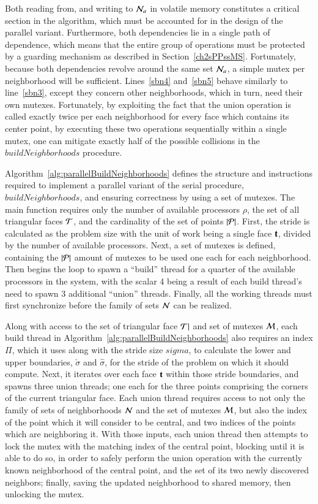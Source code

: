 Both reading from, and writing to $\mathcal{N}_a$ in volatile memory constitutes a critical section in the algorithm, which must be accounted for in the design of the parallel variant. Furthermore, both dependencies lie in a single path of dependence, which means that the entire group of operations must be protected by a guarding mechanism as described in Section~\ref{ch2sPPssMS}. Fortunately, because both dependencies revolve around the same set $\mathcal{N}_a$, a simple mutex per neighborhood will be sufficient. Lines~\ref{sbn4} and~\ref{sbn5} behave similarly to line~\ref{sbn3}, except they concern other neighborhoods, which in turn, need their own mutexes. Fortunately, by exploiting the fact that the union operation is called exactly twice per each neighborhood for every face which contains its center point, by executing these two operations sequentially within a single mutex, one can mitigate exactly half of the possible collisions in the $\mathit{buildNeighborhoods}$ procedure.

Algorithm~\ref{alg:parallelBuildNeighborhoods} defines the structure and instructions required to implement a parallel variant of the serial procedure, $\mathit{buildNeighborhoods}$, and ensuring correctness by using a set of mutexes. The main function requires only the number of available processors $\rho$, the set of all triangular faces $\mathcal{T}$, and the cardinality of the set of points $|\mathcal{P}|$. First, the stride is calculated as the problem size with the unit of work being a single face $\mathbf{t}$, divided by the number of available processors. Next, a set of mutexes is defined, containing the $|\mathcal{P}|$ amount of mutexes to be used one each for each neighborhood.  Then begins the loop to spawn a ``build'' thread for a quarter of the available processors in the system, with the scalar 4 being a result of each build thread's need to spawn 3 additional ``union'' threads. Finally, all the working threads must first synchronize before the family of sets $\mathcal{N}$ can be realized.

Along with access to the set of triangular face $\mathcal{T}|$ and set of mutexes $\mathcal{M}$, each build thread in Algorithm~\ref{alg:parallelBuildNeighborhoods} also requires an index $\Pi$, which it uses along with the stride size $sigma$, to calculate the lower and upper boundaries, $\check{\sigma}$ and $\hat{\sigma}$, for the stride of the problem on which it should compute. Next, it iterates over each face $\mathbf{t}$ within those stride boundaries, and spawns three union threads; one each for the three points comprising the corners of the current triangular face. Each union thread requires access to not only the family of sets of neighborhoods $\mathcal{N}$ and the set of mutexes $\mathcal{M}$, but also the index of the point which it will consider to be central, and two indices of the points which are neighboring it. With those inputs, each union thread then attempts to lock the mutex with the matching index of the central point, blocking until it is able to do so, in order to safely perform the union operation with the currently known neighborhood of the central point, and the set of its two newly discovered neighbors; finally, saving the updated neighborhood to shared memory, then unlocking the mutex.

